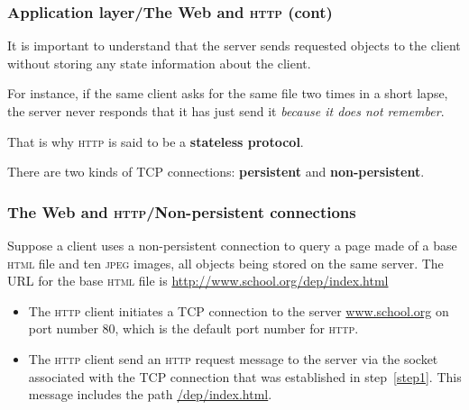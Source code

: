 %
\begin{frame}
\frametitle{Application layer/The Web and \textsc{http} (cont)}

It is important to understand that the server sends requested objects
to the client without storing any state information about the client.

\bigskip

For instance, if the same client asks for the same file two times in a
short lapse, the server never responds that it has just send it
\emph{because it does not remember}.

\bigskip

That is why \textsc{http} is said to be a \textbf{stateless
protocol}.

\bigskip

There are two kinds of TCP connections: \textbf{persistent} and
\textbf{non-persistent}.

\end{frame}

%
\begin{frame}
\frametitle{The Web and \textsc{http}/Non-persistent connections}

Suppose a client uses a non-persistent connection to query a page made
of a base \textsc{html} file and ten \textsc{jpeg} images, all objects
being stored on the same server. The URL for the base \textsc{html}
file is \url{http://www.school.org/dep/index.html}
\begin{itemize}

  \item The \textsc{http} client initiates a TCP
    connection to the server \url{www.school.org} on port number 80,
    which is the default port number for \textsc{http}.\label{step1}

  \item The \textsc{http} client send an \textsc{http} request message
    to the server via the socket associated with the TCP connection
    that was established in step~\ref{step1}. This message includes
    the path \url{/dep/index.html}.

\end{itemize}

\end{frame}

